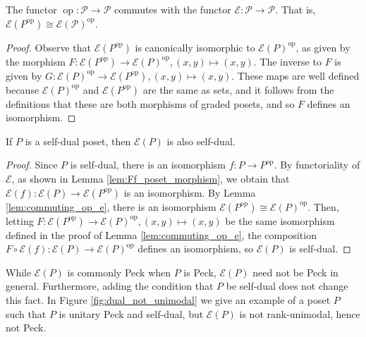 \documentclass[smallextended]{svjour3}       %
\numberwithin{equation}{section}
\newcommand\op{\operatorname{op}}
\begin{document}
\begin{lemma}
\label{lem:commuting_op_e}
The functor $\op\colon\mathcal P \rightarrow \mathcal P$ commutes with the functor $\mathcal E\colon\mathcal P \rightarrow \mathcal P$. That is, $\mathcal E(P^{\op}) \cong \mathcal E(\mathcal P)^{\op}$.
\end{lemma}
\begin{proof}
Observe that $\mathcal E(P^{\op})$ is canonically isomorphic to $\mathcal E(P)^{\op}$, as given by the morphism $F\colon\mathcal E(P^{\op}) \rightarrow \mathcal E(P)^{\op},(x,y) \mapsto (x,y)$. The inverse to $F$ is given by $G\colon\mathcal E(P)^{\op} \rightarrow \mathcal E(P^{\op}),(x,y)\mapsto (x,y)$. These maps are well defined because $\mathcal E(P)^{\op}$ and $\mathcal E(P^{\op})$ are the same as sets, and it follows from the definitions that these are both morphisms of graded posets, and so $F$ defines an isomorphism.
\end{proof}

\begin{proposition}
\label{prop:self_dual_preservation}
If $P$ is a self-dual poset, then $\mathcal E(P)$ is also self-dual.
\end{proposition}
\begin{proof}
Since $P$ is self-dual, there is an isomorphism $f\colon P \rightarrow P^{\op}$. By functoriality of $\mathcal E$, as shown in Lemma \ref{lem:Ff_poset_morphism}, we obtain that $\mathcal E(f)\colon\mathcal E(P) \rightarrow \mathcal E(P^{\op})$ is an isomorphism. By Lemma \ref{lem:commuting_op_e}, there is an isomorphism $\mathcal E(P^{\op}) \cong \mathcal E(P)^{\op}$. Then, letting $F\colon\mathcal E(P^{\op}) \rightarrow \mathcal E(P)^{\op},(x,y) \mapsto (x,y)$ be the same isomorphism defined in the proof of Lemma \ref{lem:commuting_op_e}, the composition $F\circ \mathcal E(f)\colon\mathcal E(P) \rightarrow \mathcal E(P)^{\op}$ defines an isomorphism, so $\mathcal E(P)$ is self-dual.
\end{proof}


\begin{example}
While $\mathcal{E}(P)$ is commonly Peck when $P$ is Peck, $\mathcal E(P)$ need not be Peck in general.  Furthermore, adding the condition that $P$ be self-dual does not change this fact.  In Figure \ref{fig:dual_not_unimodal} we give an example of a poset $P$ such that $P$ is unitary Peck and self-dual, but $\mathcal{E}(P)$ is not rank-unimodal, hence not Peck.
\end{example}
\end{document}
